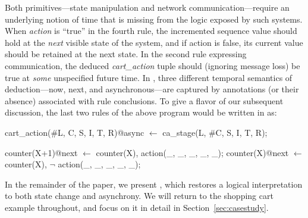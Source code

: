 
Both primitives---state manipulation and network communication---require an
underlying notion of time that is missing from the logic exposed by such systems.
When {\em action} is ``true'' in the fourth rule,
the incremented sequence value should
hold at the {\em next} visible state of the system, and if action is false, its current
value should be retained at the next state.  In the second rule expressing communication, 
the deduced {\em cart\_action}
tuple should (ignoring message loss) be true at {\em some} unspecified future time.  In \lang,
three different temporal semantics of deduction---now, next, and asynchronous---are captured by annotations (or their absence) 
associated with rule conclusions.  To give a flavor of our subsequent discussion, the last two rules of the above program would be written in \lang as:

\begin{Dedalus}
cart_action(#L, C, S, I, T, R)@async \(\leftarrow\)
  ca_stage(L, #C, S, I, T, R);

counter(X+1)@next \(\leftarrow\) counter(X),
                     action(_, _, _, _, _);
counter(X)@next   \(\leftarrow\) counter(X),
                    \(\lnot\) action(_, _, _, _, _);
\end{Dedalus}

In the remainder of the paper, we present \lang, which restores a logical interpretation to
both state change and asynchrony.  We will return to the shopping cart example throughout, and focus on it in detail 
in Section~\ref{sec:casestudy}.

